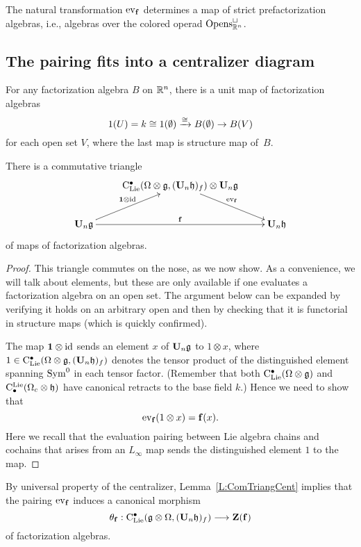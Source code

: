 \documentclass[11pt]{amsart}
\numberwithin{equation}{section}
\begin{document}
\begin{lmm}
\label{L:pairingCE}
The natural transformation ${\rm ev}_{{\bf f}}$ determines a map of strict prefactorization algebras,
i.e., algebras over the colored operad ${\rm Opens}_{\mathbb R^n}^\sqcup$.
\end{lmm}

\subsection{The pairing fits into a centralizer diagram}

For any factorization algebra $B$ on $\mathbb R^n$, 
there is a unit map of factorization algebras  
\[
1(U) = k \cong 1(\emptyset)  \xrightarrow{\cong}
B(\emptyset) \to B(V)  
\] 
for each open set $V$, where the last map is structure map of~$B$. 

\begin{lmm}\label{L:ComTriangCent} 
There is a commutative triangle 
\[
\xymatrix{
& \clies ( \Omega \otimes \fg , (\bU_n \fh)_f) \otimes \bU_n \fg
\ar[dr]^{\ev_{{\bf f}}} & \\
\bU_n \fg \ar[ur]^{\mathbf{1} \otimes \id} \ar[rr]^{\mathbf{f}}  & &  \bU_n \fh}
\]
of maps of factorization algebras.
\end{lmm}

\begin{proof}
This triangle commutes on the nose, as we now show.
As a convenience, we will talk about elements, but these are only available if one evaluates a factorization algebra on an open set.
The argument below can be expanded by verifying it holds on an arbitrary open and then by checking that it is functorial in structure maps (which is quickly confirmed).

The map $\mathbf{1} \otimes {\rm id}$ sends an element $x$ of $\mathbf U_n \mathfrak g$ to $1 \otimes x$,
where $1 \in {\rm C}_{\rm Lie}^\bullet ( \Omega \otimes \mathfrak g , (\mathbf U_n \mathfrak h)_f)$ denotes the tensor product of the distinguished element spanning ${\rm Sym}^0$ in each tensor factor.
(Remember that both ${\rm C}_{\rm Lie}^\bullet(\Omega \otimes \mathfrak g)$ and ${\rm C}^{\rm Lie}_\bullet(\Omega_c \otimes \mathfrak h)$ have canonical retracts to the base field $k$.)
Hence we need to show that
\[
{\rm ev}_{{\bf f}}(1 \otimes x) = {\bf f}(x).
\]
Here we recall that the evaluation pairing between Lie algebra chains and cochains that arises from an $L_\infty$ map sends the distinguished element $1$ to the map.
\end{proof}

By universal property of the centralizer, 
Lemma~\ref{L:ComTriangCent} implies that the pairing ${\rm ev}_{{\bf f}}$ induces a canonical morphism 
\begin{equation}
\label{eq:canonicaltocenter}
\theta_{{\bf f}}: {\rm C}_{\rm Lie}^\bullet(\mathfrak g\otimes \Omega , (\mathbf U_n \mathfrak h)_f ) \longrightarrow  {\mathbf Z}(\mathbf{f})
\end{equation}
of factorization algebras.
\end{document}
